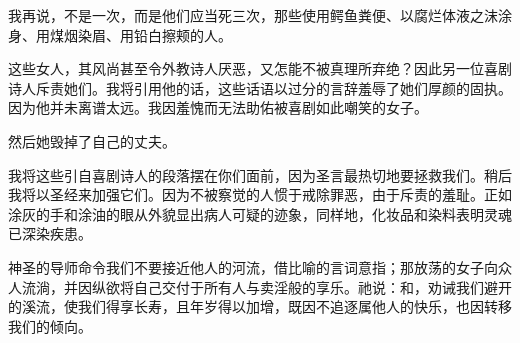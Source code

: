 我再说，不是一次，而是他们应当死三次，那些使用鳄鱼粪便、以腐烂体液之沫涂身、用煤烟染眉、用铅白擦颊的人。\par

这些女人，其风尚甚至令外教诗人厌恶，又怎能不被真理所弃绝？因此另一位喜剧诗人斥责她们。我将引用他的话，这些话语以过分的言辞羞辱了她们厚颜的固执。因为他并未离谱太远。我因羞愧而无法助佑被喜剧如此嘲笑的女子。\par

然后她毁掉了自己的丈夫。\par

\newline{}\par

我将这些引自喜剧诗人的段落摆在你们面前，因为圣言最热切地要拯救我们。稍后我将以圣经来加强它们。因为不被察觉的人惯于戒除罪恶，由于斥责的羞耻。正如涂灰的手和涂油的眼从外貌显出病人可疑的迹象，同样地，化妆品和染料表明灵魂已深染疾患。\par

神圣的导师命令我们不要接近他人的河流，借比喻的言词意指；那放荡的女子向众人流淌，并因纵欲将自己交付于所有人与卖淫般的享乐。祂说：和，劝诫我们避开的溪流，使我们得享长寿，且年岁得以加增，既因不追逐属他人的快乐，也因转移我们的倾向。\par

